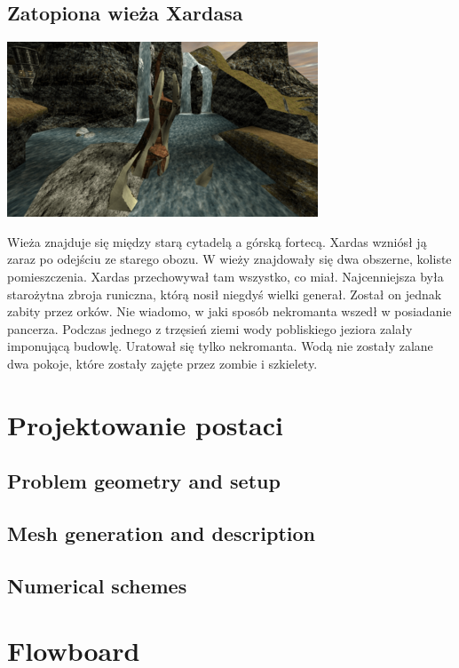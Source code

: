 \documentclass[11pt,polish, openany]{book}
\begin{document}
\section{Zatopiona wieża Xardasa}
\begin{center}
 \includegraphics[scale=1.0]{zatopionawiezaxardasa.png}
\end{center}
Wieża znajduje się między starą cytadelą a górską fortecą. Xardas wzniósł ją zaraz po odejściu ze starego obozu. W wieży znajdowały się dwa obszerne, koliste pomieszczenia. Xardas przechowywał tam wszystko, co miał. Najcenniejsza była starożytna zbroja runiczna, którą nosił niegdyś wielki generał. Został on jednak zabity przez orków. Nie wiadomo, w jaki sposób nekromanta wszedł w posiadanie pancerza. Podczas jednego z trzęsień ziemi wody pobliskiego jeziora zalały imponującą budowlę. Uratował się tylko nekromanta. Wodą nie zostały zalane dwa pokoje, które zostały zajęte przez zombie i szkielety.





\chapter{Projektowanie postaci}\label{chapt:model}
\section{Problem geometry and setup}
\section{Mesh generation and description}
\section{Numerical schemes}

\chapter{Flowboard}\label{chapt:results}
\end{document}
